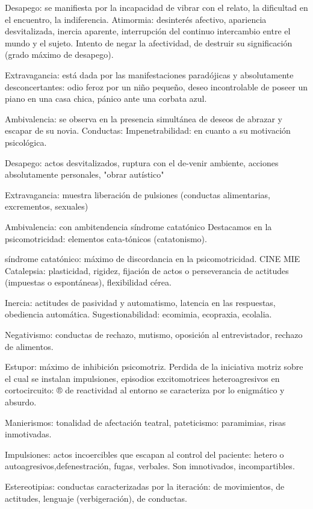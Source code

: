 \documentclass{scrbook}
\begin{document}
Desapego: se manifiesta por la incapacidad de vibrar con el relato, la dificultad en el encuentro, la indiferencia. Atimormia: desinterés afectivo, apariencia desvitalizada, inercia aparente, interrupción del continuo intercambio entre el mundo y el sujeto. Intento de negar la afectividad, de destruir su significación (grado máximo de desapego).

Extravagancia: está dada por las manifestaciones paradójicas y absolutamente desconcertantes: odio feroz por un niño pequeño, deseo incontrolable de poseer un piano en una casa chica, pánico ante una corbata azul.

Ambivalencia: se observa en la presencia simultánea de deseos de abrazar y escapar de su novia. Conductas: Impenetrabilidad: en cuanto a su motivación psicológica.

Desapego: actos desvitalizados, ruptura con el de-venir ambiente, acciones absolutamente personales, "obrar autístico"

Extravagancia: muestra liberación de pulsiones (conductas alimentarias, excrementos, sexuales)

Ambivalencia: con ambitendencia síndrome catatónico Destacamos en la psicomotricidad: elementos cata-tónicos (catatonismo).

síndrome catatónico: máximo de discordancia en la psicomotricidad. CINE MIE Catalepsia: plasticidad, rigidez, fijación de actos o perseverancia de actitudes (impuestas o espontáneas), flexibilidad cérea.

Inercia: actitudes de pasividad y automatismo, latencia en las respuestas, obediencia automática. Sugestionabilidad: ecomimia, ecopraxia, ecolalia.

Negativismo: conductas de rechazo, mutismo, oposición al entrevistador, rechazo de alimentos.

Estupor: máximo de inhibición psicomotriz. Perdida de la iniciativa motriz sobre el cual se instalan impulsiones, episodios excitomotrices heteroagresivos en cortocircuito: ® de reactividad al entorno se caracteriza por lo enigmático y absurdo.

Manierismos: tonalidad de afectación teatral, pateticismo: paramimias, risas inmotivadas.

Impulsiones: actos incoercibles que escapan al control del paciente: hetero o autoagresivos,defenestración, fugas, verbales. Son imnotivados, incompartibles.

Estereotipias: conductas caracterizadas por la iteración: de movimientos, de actitudes, lenguaje (verbigeración), de conductas.
\end{document}
